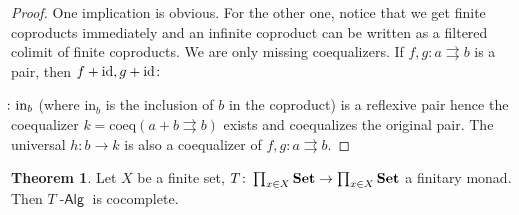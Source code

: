 \documentclass[a4paper,11pt,oneside,openany]{scrbook}
\newcommand{\catname}[1]{{\normalfont\textbf{#1}}}
\DeclareMathOperator{\Alg}{-\mathsf{Alg}}
\newcommand{\Set}{\catname{Set}}
\DeclareMathOperator{\id}{id}
\theoremstyle{definition}
\newtheorem{thm}{Theorem}[section] %
\theoremstyle{definition}
\begin{document}
\begin{proof}
One implication is obvious. For the other one, notice that we get finite coproducts immediately and an infinite coproduct can be written as a filtered colimit of finite coproducts. We are only missing coequalizers. If $f,g\colon a\rightrightarrows b$ is a pair, then $f+\id,g+\id\colon\hspace{-1.5mm}$$\hspace{-1.5mm}\colon\text{in}_b$ (where in$_b$ is the inclusion of $b$ in the coproduct) is a reflexive pair hence the coequalizer $k=\text{coeq}(a+b\rightrightarrows b)$ exists and coequalizes the original pair. The universal $h\colon b\rightarrow k$ is also a coequalizer of $f,g\colon a\rightrightarrows b$.
\end{proof}
\begin{thm}
Let $X$ be a finite set, $T\colon\prod_{x\in X}\Set\to\prod_{x\in X}\Set$ a finitary monad. Then $T\Alg$ is cocomplete.
\end{thm}
\end{document}
